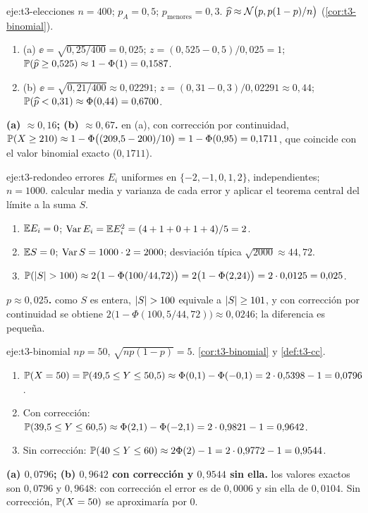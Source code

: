\begin{solucion}{eje:t3-elecciones}
\datos $n=400$; $p_A=0{,}5$; $p_{\text{menores}}=0{,}3$.
\planteamiento $\widehat p\approx\mathcal{N}\bigl(p,p(1-p)/n\bigr)$ (\cref{cor:t3-binomial}).
\pasos
\begin{enumerate}[label=\arabic*.]
  \item (a) $\ee=\sqrt{0{,}25/400}=0{,}025$; $z=(0{,}525-0{,}5)/0{,}025=1$; $\mathbb{P}(\widehat p\ge0{,}525)\approx1-\Phi(1)=0{,}1587$.
  \item (b) $\ee=\sqrt{0{,}21/400}\approx0{,}02291$; $z=(0{,}31-0{,}3)/0{,}02291\approx0{,}44$; $\mathbb{P}(\widehat p<0{,}31)\approx\Phi(0{,}44)=0{,}6700$.
\end{enumerate}
\resultado \textbf{(a) $\approx0{,}16$; (b) $\approx0{,}67$.}
\comprobacion en (a), con corrección por continuidad, $\mathbb{P}(X\ge210)\approx1-\Phi\bigl((209{,}5-200)/10\bigr)=1-\Phi(0{,}95)=0{,}1711$, que coincide con el valor binomial exacto ($0{,}1711$).
\end{solucion}

\begin{solucion}{eje:t3-redondeo}
\datos errores $E_i$ uniformes en $\{-2,-1,0,1,2\}$, independientes; $n=1000$.
\planteamiento calcular media y varianza de cada error y aplicar el teorema central del límite a la suma $S$.
\pasos
\begin{enumerate}[label=\arabic*.]
  \item $\mathbb{E} E_i=0$; $\operatorname{Var} E_i=\mathbb{E} E_i^{2}=(4+1+0+1+4)/5=2$.
  \item $\mathbb{E} S=0$; $\operatorname{Var} S=1000\cdot2=2000$; desviación típica $\sqrt{2000}\approx44{,}72$.
  \item $\mathbb{P}(\lvert S\rvert>100)\approx2\bigl(1-\Phi(100/44{,}72)\bigr)=2\bigl(1-\Phi(2{,}24)\bigr)=2\cdot0{,}0125=0{,}025$.
\end{enumerate}
\resultado \textbf{$p\approx0{,}025$.}
\comprobacion como $S$ es entera, $\lvert S\rvert>100$ equivale a $\lvert S\rvert\ge101$, y con corrección por continuidad se obtiene $2\bigl(1-\Phi(100{,}5/44{,}72)\bigr)\approx0{,}0246$; la diferencia es pequeña.
\end{solucion}

\begin{solucion}{eje:t3-binomial}
\datos $np=50$, $\sqrt{np(1-p)}=5$.
\planteamiento \cref{cor:t3-binomial} y \cref{def:t3-cc}.
\pasos
\begin{enumerate}[label=\arabic*.]
  \item $\mathbb{P}(X=50)=\mathbb{P}(49{,}5\le Y\le50{,}5)\approx\Phi(0{,}1)-\Phi(-0{,}1)=2\cdot0{,}5398-1=0{,}0796$.
  \item Con corrección: $\mathbb{P}(39{,}5\le Y\le60{,}5)\approx\Phi(2{,}1)-\Phi(-2{,}1)=2\cdot0{,}9821-1=0{,}9642$.
  \item Sin corrección: $\mathbb{P}(40\le Y\le60)\approx2\Phi(2)-1=2\cdot0{,}9772-1=0{,}9544$.
\end{enumerate}
\resultado \textbf{(a) $0{,}0796$; (b) $0{,}9642$ con corrección y $0{,}9544$ sin ella.}
\comprobacion los valores exactos son $0{,}0796$ y $0{,}9648$: con corrección el error es de $0{,}0006$ y sin ella de $0{,}0104$. Sin corrección, $\mathbb{P}(X=50)$ se aproximaría por $0$.
\end{solucion}

